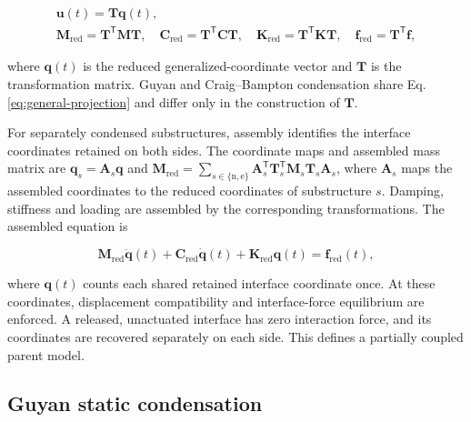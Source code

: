 \documentclass[a4paper,fleqn,review,12pt]{cas-sc}
\numberwithin{equation}{section}
\newcommand{\rev}[1]{{\color{red}#1}}
\begin{document}
\begin{equation}
	\begin{gathered}
		\bm{u}(t)=\mathbf{T}\bm{q}(t),\\
		\mathbf{M}_{\mathrm{red}}=\mathbf{T}^{\mathsf{T}}\mathbf{M}\mathbf{T},\quad
		\mathbf{C}_{\mathrm{red}}=\mathbf{T}^{\mathsf{T}}\mathbf{C}\mathbf{T},\quad
		\mathbf{K}_{\mathrm{red}}=\mathbf{T}^{\mathsf{T}}\mathbf{K}\mathbf{T},\quad
		\bm{f}_{\mathrm{red}}=\mathbf{T}^{\mathsf{T}}\bm{f},
	\end{gathered}
	\label{eq:general-projection}
\end{equation}

\noindent where \(\bm{q}(t)\) is the reduced generalized-coordinate vector and \(\mathbf{T}\) is the transformation matrix. Guyan and Craig--Bampton condensation share Eq. \eqref{eq:general-projection} and differ only in the construction of \(\mathbf{T}\).

\rev{For separately condensed substructures, assembly identifies the interface coordinates retained on both sides. The coordinate maps and assembled mass matrix are
\(\bm q_s=\mathbf A_s\bm q\) and
\(\mathbf M_{\mathrm{red}}=\sum_{s\in\{\mathrm n,\mathrm e\}}\mathbf A_s^{\mathsf T}\mathbf T_s^{\mathsf T}\mathbf M_s\mathbf T_s\mathbf A_s\),
where \(\mathbf A_s\) maps the assembled coordinates to the reduced coordinates of substructure \(s\). Damping, stiffness and loading are assembled by the corresponding transformations. The assembled equation is}

\begin{equation}
	\mathbf{M}_{\mathrm{red}}\ddot{\bm{q}}(t)
	+\mathbf{C}_{\mathrm{red}}\dot{\bm{q}}(t)
	+\mathbf{K}_{\mathrm{red}}\bm{q}(t)
	=\bm{f}_{\mathrm{red}}(t),
	\label{eq:assembled-reduced}
\end{equation}

\rev{\noindent where \(\bm q(t)\) counts each shared retained interface coordinate once. At these coordinates, displacement compatibility and interface-force equilibrium are enforced. A released, unactuated interface has zero interaction force, and its coordinates are recovered separately on each side. This defines a partially coupled parent model.}

\subsection{Guyan static condensation} \label{sec21}
\end{document}
